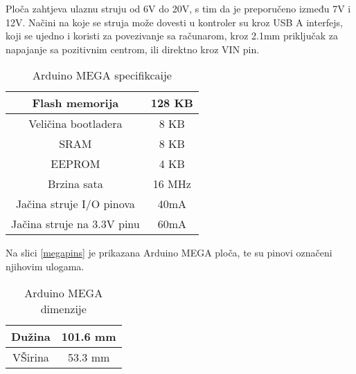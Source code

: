 \documentclass[../Document.tex]{subfiles}
\begin{document}
Ploča zahtjeva ulaznu struju od 6V do 20V, s tim da je preporučeno između 7V i 12V. Načini na koje se struja može dovesti u kontroler su kroz USB A interfejs, koji se ujedno i koristi za povezivanje sa računarom, kroz 2.1mm priključak za napajanje sa pozitivnim centrom, ili direktno kroz VIN pin.

\begin{table}[h]
  \centering
  \begin{tabular}{ |c|c| }
    \hline
    Flash memorija             & 128 KB \\
    \hline
    Veličina bootladera        & 8 KB   \\
    \hline
    SRAM                       & 8 KB   \\
    \hline
    EEPROM                     & 4 KB   \\
    \hline
    Brzina sata                & 16 MHz \\
    \hline
    Jačina struje I/O pinova   & 40mA   \\
    \hline
    Jačina struje na 3.3V pinu & 60mA   \\
    \hline
  \end{tabular}
  \caption{Arduino MEGA specifikcaije}
\end{table}

\noindent Na slici \ref{megapins} je prikazana Arduino MEGA ploča, te su pinovi označeni njihovim ulogama.


\begin{table}[h!]
  \centering
  \begin{tabular}{ |c|c| }
    \hline
    Dužina  & 101.6 mm \\
    \hline
    VŠirina & 53.3 mm  \\
    \hline
  \end{tabular}
  \caption{Arduino MEGA dimenzije}
\end{table}
\end{document}
